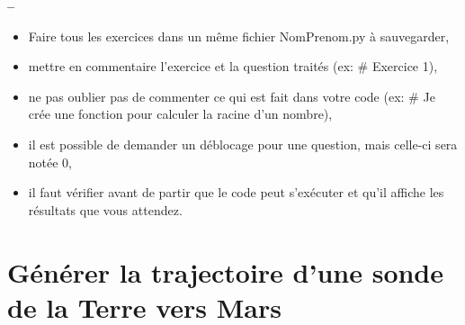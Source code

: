 


\usepackage{enumitem}







\begin{center}
{\Large\bf {\type} \no {\numero} -- \descrip}
\end{center}


\begin{boxedminipage}{.9\textwidth} 
\begin{itemize}
 \item Faire tous les exercices dans un même fichier {NomPrenom.py} à sauvegarder,
 \item mettre en commentaire l'exercice et la question traités (ex: \# Exercice 1),
 \item ne pas oublier pas de commenter ce qui est fait dans votre code (ex: \# Je crée une fonction pour calculer la racine d'un nombre),
 \item il est possible de demander un déblocage pour une question, mais celle-ci sera notée 0,
 \item il faut vérifier avant de partir que le code peut s'exécuter et qu'il affiche les résultats que vous attendez.
\end{itemize}
\end{boxedminipage}

\section*{Générer la trajectoire d'une sonde de la Terre vers Mars}


